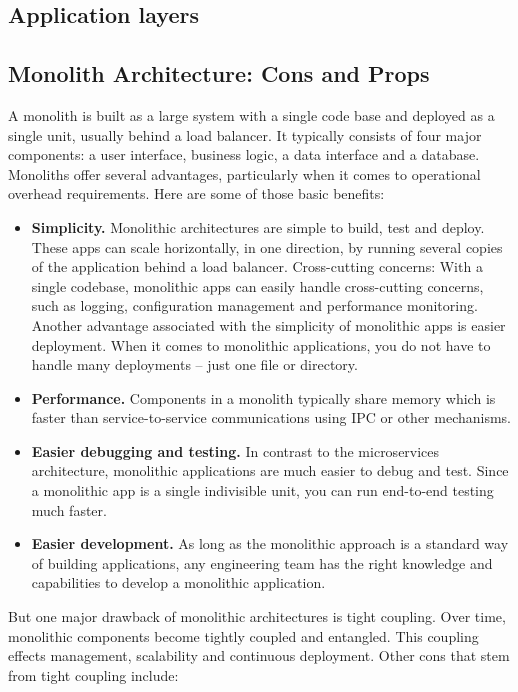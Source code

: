 \subsection{Application layers}\label{subsec:application-layers}

\subsection{Monolith Architecture: Cons and Props}\label{subsec:monolith-architecture:-cons-and-props}

A monolith is built as a large system with a single code base and deployed as a single unit, usually behind a load balancer.
It typically consists of four major components: a user interface, business logic, a data interface and a database.
Monoliths offer several advantages, particularly when it comes to operational overhead requirements.
Here are some of those basic benefits:

\begin{itemize}
    \item \textbf{Simplicity.} Monolithic architectures are simple to build, test and deploy.
    These apps can scale horizontally, in one direction, by running several copies of the application behind a load balancer.
    Cross-cutting concerns: With a single codebase, monolithic apps can easily handle cross-cutting concerns, such as logging,
    configuration management and performance monitoring.
    Another advantage associated with the simplicity of monolithic apps is easier deployment.
    When it comes to monolithic applications, you do not have to handle many deployments – just one file or directory.
    \item \textbf{Performance.} Components in a monolith typically share memory which is faster than service-to-service communications using
    IPC or other mechanisms.
    \item \textbf{Easier debugging and testing.}
    In contrast to the microservices architecture, monolithic applications are much easier to debug and test.
    Since a monolithic app is a single indivisible unit, you can run end-to-end testing much faster.
    \item \textbf{Easier development.} As long as the monolithic approach is a standard way of building applications,
    any engineering team has the right knowledge and capabilities to develop a monolithic application.
\end{itemize}
But one major drawback of monolithic architectures is tight coupling.
Over time, monolithic components become tightly coupled and entangled.
This coupling effects management, scalability and continuous deployment.
Other cons that stem from tight coupling include:

